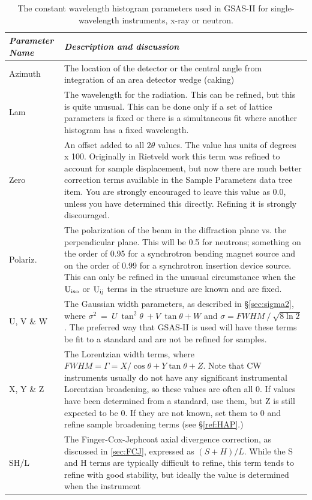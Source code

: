 \begin{table}
\centering
\caption{The constant wavelength histogram parameters used in GSAS-II for single-wavelength instruments, x-ray or neutron.}
\label{tab:CWprofile1}
\begin{tabular}{| l | p{} |}
\hline
\textit{Parameter Name} & \textit{Description and discussion} \\
\hline
Azimuth & The location of the detector or the central angle from integration of an area detector wedge (caking)\\
\hline
Lam & The wavelength for the radiation. This can be refined, but this is quite unusual. This can be done only if a set of lattice parameters is fixed or there is a simultaneous fit where another histogram has a fixed wavelength. \\
\hline
Zero & An offset added to all $2\theta$ values. The value has units of degrees x 100. 
Originally in Rietveld work this term was refined to account for sample displacement, but now there are much better correction terms available in the Sample Parameters data tree item. 
You are strongly encouraged to leave this value as 0.0, unless you have determined this directly. Refining it is strongly discouraged.\\
\hline
Polariz. & The polarization of the beam in the diffraction plane vs. the perpendicular plane. This will be 0.5 for neutrons; something on the order of 0.95 for a synchrotron bending magnet source and on the order of 0.99 for a synchrotron insertion device source. This can only be refined in the unusual circumstance when the $\rm U_{iso}$ or $\rm U_{ij}$ terms in the structure are known and are fixed. \\
\hline
U, V \& W & The Gaussian width parameters, as described in \S\ref{sec:sigma2}, where $\sigma^2\ =\ U\ \tan^2{\theta}\ +V\ \tan{\theta}+W$ and $\sigma=FWHM\ /\ \sqrt{8\ln{2}}$. The preferred way that GSAS-II is used will have these terms be fit to a standard and are not be refined for samples.\\
\hline
X, Y \& Z & The Lorentzian width terms, where $FWHM = \Gamma = X / \cos\theta + Y \tan\theta + Z$. Note that CW instruments usually do not have any significant instrumental Lorentzian broadening, so these values are often all 0. 
If values have been determined from a standard, use them, but Z is still expected to be 0. If they are not known, set them to 0 and refine sample broadening terms (see \S\ref{ref:HAP}.)
\\
\hline
SH/L & The Finger-Cox-Jephcoat axial divergence correction, as discussed in \ref{sec:FCJ}, expressed as $(S+H)/L$. While the S and H terms are typically difficult to refine, this term tends to refine with good stability, but ideally the value is determined when the instrument \\
\hline
\end{tabular}
\end{table}

